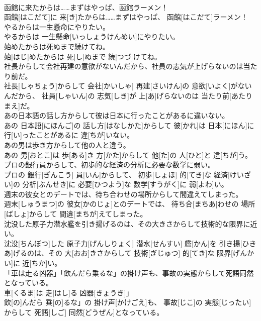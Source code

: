 \documentclass[8pt]{extreport}
\begin{document}
\begin{CJK}{UTF8}{min}
\\	函館に来たからは……まずはやっぱ、函館ラーメン！	
\\	函館[はこだて]に 来[き]たからは……まずはやっぱ、 函館[はこだて]ラーメン！
\\	やるからは一生懸命にやりたい。	
\\	やるからは 一生懸命[いっしょうけんめい]にやりたい。
\\	始めたからは死ぬまで続けてね。	
\\	始[はじ]めたからは 死[し]ぬまで 続[つづ]けてね。
\\	社長からして会社再建の意欲がないんだから、社員の志気が上げらないのは当たり前だ。	
\\	社長[しゃちょう]からして 会社[かいしゃ] 再建[さいけん]の 意欲[いよく]がないんだから、 社員[しゃいん]の 志気[しき]が 上[あ]げらないのは 当たり前[あたりまえ]だ。
\\	あの日本語の話し方からして彼は日本に行ったことがあるに違いない。	
\\	あの 日本語[にほんご]の 話し方[はなしかた]からして 彼[かれ]は 日本[にほん]に 行[い]ったことがあるに 違[ちが]いない。
\\	あの男は歩き方からして他の人と違う。	
\\	あの 男[おとこ]は 歩[ある]き 方[かた]からして 他[た]の 人[ひと]と 違[ちが]う。
\\	プロの銀行員からして、初歩的な経済の分析に必要な数学に弱い。	
\\	プロの 銀行[ぎんこう] 員[いん]からして、 初歩[しょほ] 的[てき]な 経済[けいざい]の 分析[ぶんせき]に 必要[ひつよう]な 数学[すうがく]に 弱[よわ]い。
\\	週末の彼女とのデートでは、待ち合わせの場所からして間違えてしまった。	
\\	週末[しゅうまつ]の 彼女[かのじょ]とのデートでは、 待ち合[まちあ]わせの 場所[ばしょ]からして 間違[まちが]えてしまった。
\\	沈没した原子力潜水艦を引き揚げるのは、その大きさからして技術的な限界に近い。	
\\	沈没[ちんぼつ]した 原子力[げんしりょく] 潜水[せんすい] 艦[かん]を 引き揚[ひきあ]げるのは、その 大[おお]きさからして 技術[ぎじゅつ] 的[てき]な 限界[げんかい]に 近[ちか]い。
\\	「車は走る凶器」「飲んだら乗るな」の掛け声も、事故の実態からして死語同然となっている。	
\\	車[くるま]は 走[はし]る 凶器[きょうき]」
\\	飲[の]んだら 乗[の]るな」の 掛け声[かけごえ]も、 事故[じこ]の 実態[じったい]からして 死語[しご] 同然[どうぜん]となっている。

\end{CJK}
\end{document}
